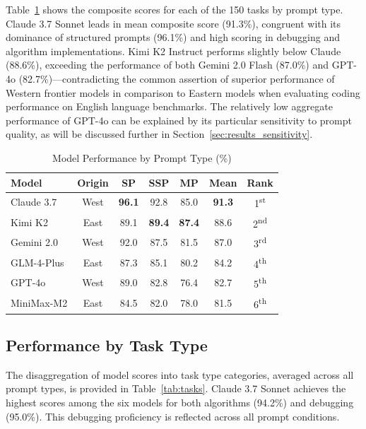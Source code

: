 \documentclass[conference]{IEEEtran}
\begin{document}
Table~\ref{tab:overall} shows the composite scores for each of the 150 tasks by prompt type. Claude 3.7 Sonnet leads in mean composite score (91.3\%), congruent with its dominance of structured prompts (96.1\%) and high scoring in debugging and algorithm implementations. Kimi K2 Instruct performs slightly below Claude (88.6\%), exceeding the performance of both Gemini 2.0 Flash (87.0\%) and GPT-4o (82.7\%)—contradicting the common assertion of superior performance of Western frontier models in comparison to Eastern models when evaluating coding performance on English language benchmarks. The relatively low aggregate performance of GPT-4o can be explained by its particular sensitivity to prompt quality, as will be discussed further in Section~\ref{sec:results_sensitivity}.

\begin{table}[H]
\centering
\caption{Model Performance by Prompt Type (\%)}
\label{tab:overall}
\renewcommand{\arraystretch}{1.35}
\begin{tabular}{lcccccc}
\toprule
\textbf{Model} & \textbf{Origin} & \textbf{SP} & \textbf{SSP} & \textbf{MP} & \textbf{Mean} & \textbf{Rank} \\
\midrule
Claude 3.7    & West & \textbf{96.1} & 92.8 & 85.0 & \textbf{91.3} & 1\textsuperscript{st} \\
Kimi K2       & East & 89.1 & \textbf{89.4} & \textbf{87.4} & 88.6 & 2\textsuperscript{nd} \\
Gemini 2.0    & West & 92.0 & 87.5 & 81.5 & 87.0 & 3\textsuperscript{rd} \\
GLM-4-Plus    & East & 87.3 & 85.1 & 80.2 & 84.2 & 4\textsuperscript{th} \\
GPT-4o        & West & 89.0 & 82.8 & 76.4 & 82.7 & 5\textsuperscript{th} \\
MiniMax-M2    & East & 84.5 & 82.0 & 78.0 & 81.5 & 6\textsuperscript{th} \\
\bottomrule
\end{tabular}
\end{table}

\subsection{Performance by Task Type}

The disaggregation of model scores into task type categories, averaged across all prompt types, is provided in Table~\ref{tab:tasks}. Claude 3.7 Sonnet achieves the highest scores among the six models for both algorithms (94.2\%) and debugging (95.0\%). This debugging proficiency is reflected across all prompt conditions.
\end{document}
